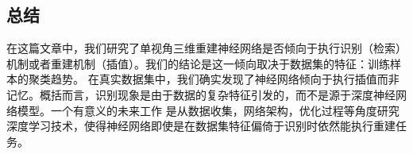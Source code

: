 \documentclass[bachelor, nocolorlinks, printoneside]{seuthesis} %
\begin{document}
\begin{Main}
\chapter{总结}
在这篇文章中，我们研究了单视角三维重建神经网络是否倾向于执行识别（检索）机制或者重建机制（插值）。我们的结论是这一倾向取决于数据集的特征：训练样本的聚类趋势。
在真实数据集中，我们确实发现了神经网络倾向于执行插值而非记忆。概括而言，识别现象是由于数据的复杂特征引发的，而不是源于深度神经网络模型。一个有意义的未来工作
是从数据收集，网络架构，优化过程等角度研究深度学习技术，使得神经网络即使是在数据集特征偏倚于识别时依然能执行重建任务。

\end{Main} %



\end{document}
